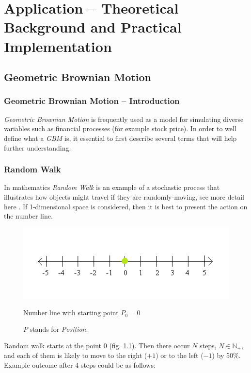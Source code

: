 \chapter{Application -- Theoretical Background and Practical Implementation}

\section{Geometric Brownian Motion}
        
    \subsection{Geometric Brownian Motion -- Introduction}
        \textit{Geometric Brownian Motion} is frequently used as a model for simulating diverse variables such as financial processes (for example stock price). In order to well define what a \textit{GBM} is, it essential to first describe several terms that will help further understanding.
    
    \subsection{Random Walk}
        In mathematics \textit{Random Walk} is an example of a stochastic process that illustrates how objects might travel if they are randomly-moving, see more detail here \cite{randomWalk}.
        If 1-dimensional space is considered, then it is best to present the action on the number line.
        \begin{figure}[H]
            \centering
            \includegraphics{img/numberLine.png}
            \caption{Number line with starting point $P_0=0$}
            \caption*{$P$ stands for \textit{Position}.}
            \label{fig:numberLine_start}
        \end{figure}
        Random walk starts at the point 0 (fig. \ref{fig:numberLine_start}). Then there occur $N$ steps, $N \in \mathbb{N}_+$, and each of them is likely to move to the right ($+1$) or to the left ($-1$) by 50\%. Example outcome after 4 steps could be as follows:
        
